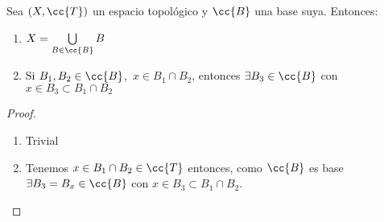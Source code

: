 \begin{teo}\label{teorema1_6}
    Sea $(X,\cc{T})$ un espacio topológico y $\cc{B}$ una base suya. Entonces:
    \begin{enumerate}
        \item[\objetivo{B1}] $X=\bigcup\limits_{B\in \cc{B}}B$
        \item[\objetivo{B2}] Si $B_1,B_2\in \cc{B}$,\ $x\in B_1\cap B_2$, entonces $\exists B_3 \in \cc{B}$ con $x\in B_3 \subset B_1 \cap B_2$
    \end{enumerate}

    \begin{proof}\
        \begin{enumerate}
            \item[\apuntar{B1}] Trivial
            \item[\apuntar{B2}] Tenemos $x\in B_1\cap B_2\in \cc{T}$ entonces, como $\cc{B}$ es base $\exists B_3=B_x \in \cc{B}$ con $x\in B_3 \subset B_1 \cap B_2$.
        \end{enumerate}
    \end{proof}
\end{teo}

